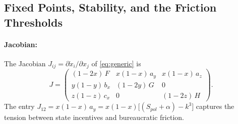 \documentclass[10pt]{article}
\begin{document}
\subsection{Fixed Points, Stability, and the Friction Thresholds}\label{sec:jac}
\paragraph{Jacobian:} The Jacobian $J_{ij}=\partial\dot x_i/\partial x_j$ of \cref{eq:generic} is
\begin{equation}
J =
\begin{pmatrix}
(1-2x)\,F & x(1-x)\,a_y & x(1-x)\,a_z \\[4pt]
y(1-y)\,b_x & (1-2y)\,G & 0 \\[4pt]
z(1-z)\,c_x & 0 & (1-2z)\,H
\end{pmatrix}.
\label{eq:jacobian}
\end{equation}
The entry $J_{12}=x(1-x)\,a_y = x(1-x)\big[(S_{pol}+\alpha)-k^3\big]$ captures the tension between state incentives and bureaucratic friction.
\end{document}
